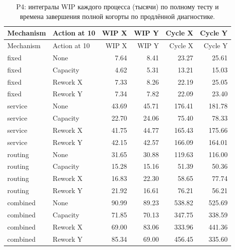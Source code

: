 \begin{longtable}{llrrrr}\caption{P4: интегралы WIP каждого процесса (тысячи) по полному тесту и времена завершения полной когорты по продлённой диагностике.}\\\toprule

Mechanism & Action at 10 & WIP X & WIP Y & Cycle X & Cycle Y\\\midrule\endfirsthead

\toprule Mechanism & Action at 10 & WIP X & WIP Y & Cycle X & Cycle Y\\\midrule\endhead

fixed & None & 7.64 & 8.41 & 23.27 & 25.61\\

fixed & Capacity & 4.62 & 5.31 & 13.21 & 15.03\\

fixed & Rework X & 7.33 & 8.26 & 22.19 & 25.05\\

fixed & Rework Y & 7.34 & 7.82 & 22.09 & 23.40\\

service & None & 43.69 & 45.71 & 176.41 & 181.78\\

service & Capacity & 22.70 & 24.06 & 75.40 & 78.33\\

service & Rework X & 41.75 & 44.77 & 165.43 & 175.66\\

service & Rework Y & 42.15 & 42.57 & 166.09 & 164.01\\

routing & None & 31.65 & 30.88 & 119.63 & 116.00\\

routing & Capacity & 15.28 & 15.16 & 51.39 & 50.36\\

routing & Rework X & 16.83 & 22.30 & 58.65 & 77.74\\

routing & Rework Y & 21.92 & 16.61 & 76.21 & 56.21\\

combined & None & 90.99 & 89.23 & 538.82 & 525.69\\

combined & Capacity & 71.85 & 70.13 & 347.75 & 338.59\\

combined & Rework X & 69.00 & 83.06 & 333.96 & 441.36\\

combined & Rework Y & 85.34 & 69.00 & 456.45 & 335.60\\

\bottomrule\end{longtable}

